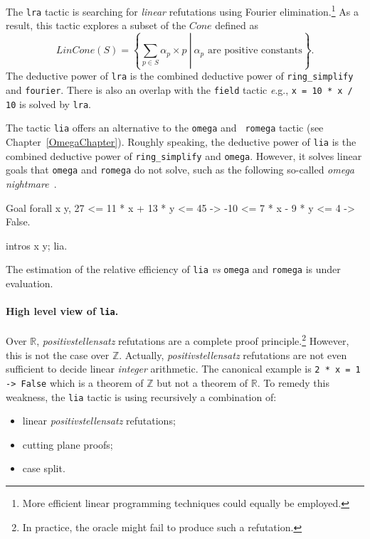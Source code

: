 \label{sec:lra}
The {\tt lra} tactic is searching for \emph{linear} refutations using
Fourier elimination.\footnote{More efficient linear programming
  techniques could equally be employed.} As a result, this tactic
explores a subset of the $\mathit{Cone}$ defined as
\[
\mathit{LinCone}(S) =\left\{ \left. \sum_{p \in S} \alpha_p \times p~\right|
~\alpha_p \mbox{ are positive constants} \right\}.
\]
The deductive power of {\tt lra} is the combined deductive power of {\tt ring\_simplify} and {\tt fourier}.
%
There is also an overlap with the {\tt field} tactic {\emph e.g.}, {\tt x = 10 * x / 10} is solved by {\tt lra}.


\label{sec:lia}

The tactic {\tt lia} offers an alternative to the {\tt omega} and {\tt
  romega} tactic (see Chapter~\ref{OmegaChapter}).
%
Roughly speaking, the deductive power of {\tt lia} is the combined deductive power of {\tt ring\_simplify} and {\tt omega}.
%
However, it solves linear goals that {\tt omega} and {\tt romega} do not solve, such as the
following so-called \emph{omega nightmare}~\cite{TheOmegaPaper}.
\begin{coq_example*}
Goal forall x y,
  27 <= 11 * x + 13 * y <= 45 ->
  -10 <= 7 * x - 9 * y <= 4 ->  False.
\end{coq_example*}
\begin{coq_eval}
intros x y; lia.
\end{coq_eval}
The estimation of the relative efficiency of {\tt lia} \emph{vs} {\tt omega}
and {\tt romega} is under evaluation.

\paragraph{High level view of {\tt lia}.}
Over $\mathbb{R}$, \emph{positivstellensatz} refutations are a complete
proof principle.\footnote{In practice, the oracle might fail to produce
  such a refutation.}
%
However, this is not the case over $\mathbb{Z}$.
%
Actually, \emph{positivstellensatz} refutations are not even sufficient
to decide linear \emph{integer} arithmetic.
%
The canonical example is {\tt 2 * x = 1 -> False} which is a theorem of $\mathbb{Z}$ but not a theorem of $\mathbb{R}$.
%
To remedy this weakness, the {\tt lia} tactic is using recursively a combination of:
%
\begin{itemize}
\item linear \emph{positivstellensatz} refutations;
\item cutting plane proofs;
\item case split.
\end{itemize}

